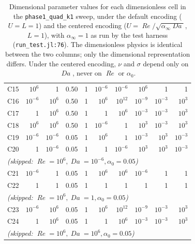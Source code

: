 \documentclass[11pt]{article}
\newcommand{\Reyn}{\operatorname{\mathit{Re}}}
\newcommand{\Damk}{\operatorname{\mathit{Da}}}
\begin{document}
\begin{table}[!htbp]
\begin{tabular}{l rrr rrr rrr}
    C15 & $10^{6}$  & 1         & 0.50 & 1 & $10^{-6}$   & $10^{-6}$   & $10^{6}$  & 1           & 1         \\
    C16 & $10^{-6}$ & $10^{6}$  & 0.50 & 1 & $10^{6}$    & $10^{12}$   & $10^{-9}$ & $10^{-3}$   & $10^{3}$  \\
    C17 & 1         & $10^{6}$  & 0.50 & 1 & 1           & $10^{6}$    & $10^{-3}$ & $10^{-3}$   & $10^{3}$  \\
    C18 & $10^{6}$  & $10^{6}$  & 0.50 & 1 & $10^{-6}$   & 1           & $10^{3}$  & $10^{-3}$   & $10^{3}$  \\
    \midrule
    C19 & $10^{-6}$ & $10^{-6}$ & 0.05 & 1 & $10^{6}$    & $1$         & $10^{-3}$ & $10^{3}$    & $10^{-3}$ \\
    C20 & 1         & $10^{-6}$ & 0.05 & 1 & 1           & $10^{-6}$   & $10^{3}$  & $10^{3}$    & $10^{-3}$ \\
    \multicolumn{10}{l}{\emph{(skipped: $\Reyn = 10^{6}, \Damk = 10^{-6}, \alpha_0 = 0.05$)}} \\
    C21 & $10^{-6}$ & 1         & 0.05 & 1 & $10^{6}$    & $10^{6}$    & $10^{-6}$ & 1           & 1         \\
    C22 & 1         & 1         & 0.05 & 1 & 1           & 1           & 1         & 1           & 1         \\
    \multicolumn{10}{l}{\emph{(skipped: $\Reyn = 10^{6}, \Damk = 1, \alpha_0 = 0.05$)}} \\
    C23 & $10^{-6}$ & $10^{6}$  & 0.05 & 1 & $10^{6}$    & $10^{12}$   & $10^{-9}$ & $10^{-3}$   & $10^{3}$  \\
    C24 & 1         & $10^{6}$  & 0.05 & 1 & 1           & $10^{6}$    & $10^{-3}$ & $10^{-3}$   & $10^{3}$  \\
    \multicolumn{10}{l}{\emph{(skipped: $\Reyn = 10^{6}, \Damk = 10^{6}, \alpha_0 = 0.05$)}} \\
    \bottomrule
  \end{tabular}
  \caption{Dimensional parameter values for each dimensionless cell in the
    \texttt{phase1\_quad\_k1} sweep, under the default encoding
    ($U=L=1$) and the centered encoding
    ($U = \Reyn/\sqrt{\alpha_\infty \Damk}$, $L=1$), with
    $\alpha_\infty = 1$ as run by the test harness
    (\texttt{run\_test.jl:76}). The dimensionless physics is identical
    between the two columns; only the dimensional representation differs.
    Under the centered encoding, $\nu$ and $\sigma$ depend only on
    $\Damk$, never on $\Reyn$ or $\alpha_0$.}
  \label{tab:per-cell}
\end{table}
\end{document}
